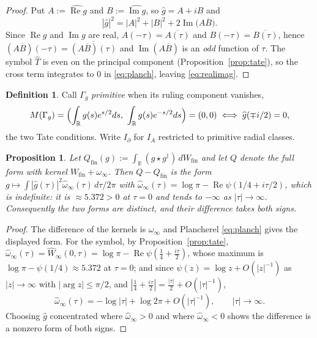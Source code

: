 \documentclass[11pt]{amsart}
\newtheorem{proposition}[theorem]{Proposition}
\theoremstyle{definition}
\newtheorem{definition}[theorem]{Definition}
\theoremstyle{remark}
\newcommand{\R}{\mathbb R}
\newcommand{\Rel}{\operatorname{Re}}
\newcommand{\Iml}{\operatorname{Im}}
\newcommand{\Wfin}{W_{\mathrm{fin}}}
\begin{document}
\begin{proof}
Put $A:=\widehat{\Rel g}$ and $B:=\widehat{\Iml g}$, so $\widehat g=A+iB$ and
\[
  |\widehat g|^2=|A|^2+|B|^2+2\Iml\bigl(A\overline B\bigr).
\]
Since $\Rel g$ and $\Iml g$ are real, $A(-\tau)=\overline{A(\tau)}$ and
$B(-\tau)=\overline{B(\tau)}$, hence
$(A\overline B)(-\tau)=\overline{(A\overline B)(\tau)}$ and
$\Iml(A\overline B)$ is an \emph{odd} function of $\tau$. The symbol
$\widehat T$ is even on the principal component
(Proposition~\ref{prop:tate}), so the cross term integrates to $0$ in
\eqref{eq:planch}, leaving \eqref{eq:realimag}.
\end{proof}

\begin{definition}\label{def:primitive}
Call $\Gamma_g$ \emph{primitive} when its ruling component vanishes,
\begin{equation}\label{eq:primitive}
  M(\Gamma_g)=\Bigl(\int_\R g(s)e^{s/2}ds,\ \int_\R g(s)e^{-s/2}ds\Bigr)
   =(0,0)\iff\widehat g(\mp i/2)=0 ,
\end{equation}
the two Tate conditions. Write $I_\partial$ for $I_A$ restricted to primitive
radial classes.
\end{definition}

\begin{proposition}\label{prop:formsdiffer}
Let $Q_{\mathrm{fin}}(g):=\int_\R(g\star g^\dagger)\,d\Wfin$ and let $Q$ denote
the full form with kernel $\Wfin+\omega_\infty$. Then $Q-Q_{\mathrm{fin}}$ is
the form $g\mapsto\int|\widehat g(\tau)|^2\widehat\omega_\infty(\tau)\,
d\tau/2\pi$ with
$\widehat\omega_\infty(\tau)=\log\pi-\Rel\psi(1/4+i\tau/2)$, which is
\emph{indefinite}: it is $\approx5.372>0$ at $\tau=0$ and tends to $-\infty$
as $|\tau|\to\infty$. Consequently the two forms are distinct, and their
difference takes both signs.
\end{proposition}

\begin{proof}
The difference of the kernels is $\omega_\infty$ and Plancherel
\eqref{eq:planch} gives the displayed form. For the symbol, by
Proposition~\ref{prop:tate},
$\widehat\omega_\infty(\tau)=\widehat W_\infty(0,\tau)
=\log\pi-\Rel\psi(\tfrac14+\tfrac{i\tau}2)$, whose maximum is
$\log\pi-\psi(1/4)\approx5.372$ at $\tau=0$; and since
$\psi(z)=\log z+O(|z|^{-1})$ as $|z|\to\infty$ with $|\arg z|\le\pi/2$, and
$|\tfrac14+\tfrac{i\tau}2|=\tfrac{|\tau|}2+O(|\tau|^{-1})$,
\begin{equation}\label{eq:symbolasym}
  \widehat\omega_\infty(\tau)=-\log|\tau|+\log2\pi+O(|\tau|^{-1}),
  \qquad|\tau|\to\infty .
\end{equation}
Choosing $\widehat g$ concentrated where $\widehat\omega_\infty>0$ and where
$\widehat\omega_\infty<0$ shows the difference is a nonzero form of both signs.
\end{proof}
\end{document}
